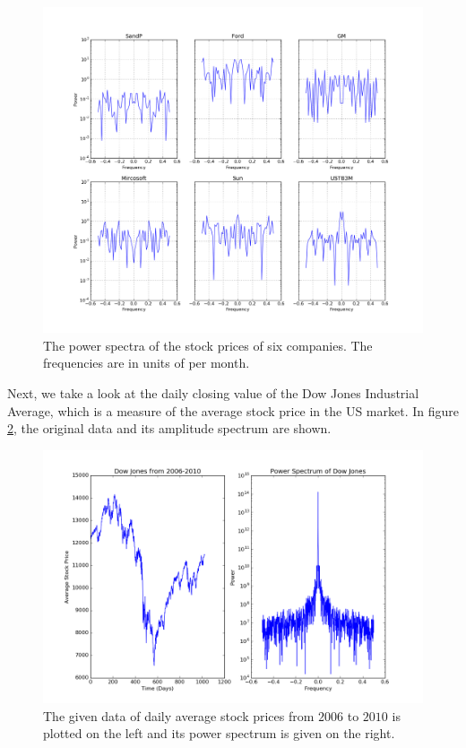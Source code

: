 \message{ !name(austin_report.tex)}\documentclass[11pt, letterpage, twocolumn]{article}
\begin{document}
\begin{figure}
  \includegraphics[width=\linewidth]{stocks_power_spectrum.png}
  \caption{
    The power spectra of the stock prices of six companies. The frequencies are
    in units of per month.
  }
  \label{fig:stocks_ps}
\end{figure}

Next, we take a look at the daily closing value of the Dow Jones Industrial Average, which is a measure of the average stock price in the US market. In figure \ref{fig:dow}, the original data and its amplitude spectrum are shown.

\begin{figure}
  \includegraphics[width=\linewidth]{dow.png}
  \caption{
    The given data of daily average stock prices from $2006$ to $2010$ is plotted on the left and its power spectrum is given on the right.
  }
  \label{fig:dow}
\end{figure}
\end{document}
